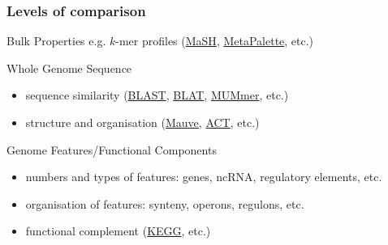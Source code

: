 \begin{frame}
  \frametitle{Levels of comparison}
    \begin{alertblock}{Bulk Properties}
      \textcolor{hutton_green}{e.g. $k$-mer profiles} (\textcolor{hutton_purple}{\href{https://github.com/marbl/Mash}{MaSH}}, \textcolor{hutton_purple}{\href{https://github.com/dkoslicki/MetaPalette}{MetaPalette}}, etc.)
    \end{alertblock}
    \begin{block}{Whole Genome Sequence}
      \begin{itemize}
        \item \textcolor{hutton_blue}{sequence similarity} (\textcolor{hutton_purple}{\href{https://blast.ncbi.nlm.nih.gov/Blast.cgi?PAGE_TYPE=BlastDocs&DOC_TYPE=Download}{BLAST}}, \textcolor{hutton_purple}{\href{https://genome.ucsc.edu/FAQ/FAQblat.html}{BLAT}}, \textcolor{hutton_purple}{\href{http://mummer.sourceforge.net/}{MUMmer}}, etc.)
        \item \textcolor{hutton_blue}{structure and organisation} (\textcolor{hutton_purple}{\href{http://darlinglab.org/mauve/mauve.html}{Mauve}}, \textcolor{hutton_purple}{\href{http://www.sanger.ac.uk/science/tools/artemis-comparison-tool-act}{ACT}}, etc.)
      \end{itemize}
    \end{block}
    \begin{alertblock}{Genome Features/Functional Components}
      \begin{itemize}
        \item \textcolor{RawSienna}{numbers and types of features: genes, ncRNA, regulatory elements, etc.}
        \item \textcolor{RawSienna}{organisation of features: synteny, operons, regulons, etc.}
        \item \textcolor{RawSienna}{functional complement} (\textcolor{hutton_purple}{\href{http://www.genome.jp/kegg/}{KEGG}}, etc.)
      \end{itemize}
    \end{alertblock}
\end{frame}